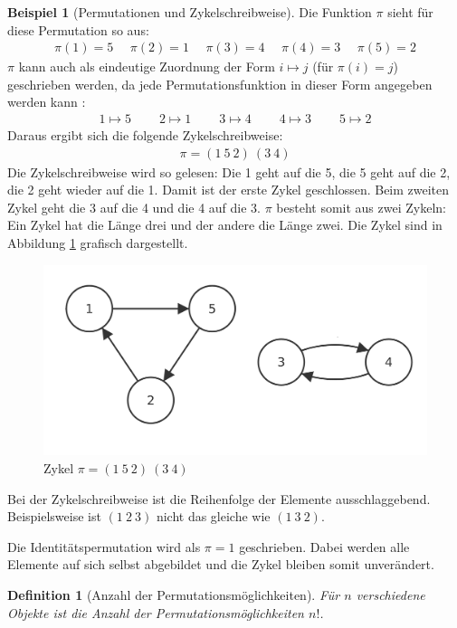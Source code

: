 \documentclass[12pt,a4paper, usenames, dvipsnames]{article}
\theoremstyle{mystyle}
\newtheorem{definition}{Definition}
\theoremstyle{definition}
\newtheorem{bsp}{Beispiel}[definition]
\begin{document}
\begin{bsp}[Permutationen und Zykelschreibweise]
Die Funktion $\pi$ sieht für diese Permutation so aus:
\begin{align*}
\pi(1) = 5 \ \ \ \ \ \  \pi(2) = 1 \ \ \ \ \ \ \pi(3) = 4 \ \ \ \ \ \ \pi(4) = 3 \ \ \ \ \ \ \pi(5) = 2 
\end{align*}
$\pi$ kann auch als eindeutige Zuordnung der Form $i \mapsto j$ (für $\pi(i)=j$) geschrieben werden, da jede Permutationsfunktion in dieser Form angegeben werden kann \cite{JC}:
\begin{align*}
1 \mapsto 5 \ \ \ \ \ \ \ \ \ \  2\mapsto 1 \ \ \ \ \ \ \ \ \ \ 3\mapsto 4 \ \ \ \ \ \ \ \ \ \ 4\mapsto 3 \ \ \ \ \ \ \ \ \ \ 5\mapsto 2 
\end{align*}
Daraus ergibt sich die folgende Zykelschreibweise:
\begin{align*}
\pi = (1 \ 5 \ 2)\ (3 \ 4)
\end{align*}
Die Zykelschreibweise wird so gelesen: Die 1 geht auf die 5, die 5 geht auf die 2, die 2 geht wieder auf die 1. Damit ist der erste Zykel geschlossen. Beim zweiten Zykel geht die 3 auf die 4 und die 4 auf die 3. $\pi$ besteht somit aus zwei Zykeln: Ein Zykel hat die Länge drei und der andere die Länge zwei. Die Zykel sind in Abbildung \ref{Abbildung_ZykelVonf} grafisch dargestellt.
\begin{figure}[H]
\centering
\includegraphics[scale=0.13]{Zykel_152.png}
\caption{Zykel $\pi = (1 \ 5 \ 2)\ (3 \ 4)$}
\label{Abbildung_ZykelVonf}
\end{figure}
Bei der Zykelschreibweise ist die Reihenfolge der Elemente ausschlaggebend. Beispielsweise ist $(1 \ 2 \ 3)$ nicht das gleiche wie $(1 \ 3 \ 2)$. 

Die Identitätspermutation wird als $\pi = 1$ geschrieben. Dabei werden alle Elemente auf sich selbst abgebildet und die Zykel bleiben somit unverändert.
\end{bsp}

\begin{definition}[Anzahl der Permutationsmöglichkeiten]
Für $n$ verschiedene Objekte ist die Anzahl der Permutationsmöglichkeiten $n!$.
\end{definition}
\end{document}
